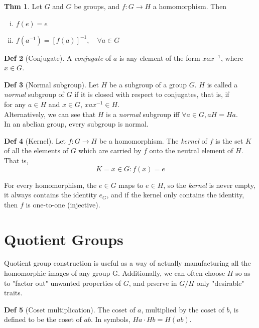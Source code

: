 \documentclass{article}
\theoremstyle{definition}
\newtheorem{definition}{Def}[section]
\newtheorem{theorem}[definition]{Thm}
\begin{document}
\begin{theorem}
    Let $G$ and $G$ be groups, and $f: G \rightarrow H$ a homomorphism. Then
    \begin{enumerate}[i.]
	\item $f(e) = e$
	\item $f(a^{-1}) = [f(a)]^{-1}, \quad \forall a \in G$
    \end{enumerate}
\end{theorem}

\begin{definition}[Conjugate]
    A \emph{conjugate} of $a$ is any element of the form $xax^{-1}$, where $x \in G$.
\end{definition}

\begin{definition}[Normal subgroup]
    Let $H$ be a subgroup of a group $G$. $H$ is called a \emph{normal} subgroup of $G$ if it is closed with respect to conjugates, that is, if\\
    for any $a \in H$ and $x \in G$, $xax^{-1} \in H$.
    \\
    Alternatively, we can see that $H$ is a \emph{normal} subgroup iff $\forall a \in G, aH = Ha$.
    \\
    In an abelian group, every subgroup is normal.
\end{definition}

\begin{definition}[Kernel]
    Let $f: G \rightarrow H$ be a homomorphism. The \emph{kernel} of $f$ is the set $K$ of all the elements of $G$ which are carried by $f$ onto the neutral element of $H$. That is,
    $$K = {x \in G : f(x) = e}$$
\end{definition}
For every homomorphism, the $e \in G$ maps to $e \in H$, so the \emph{kernel} is never empty, it always contains the identity $e_G$, and if the kernel only contains the identity, then $f$ is one-to-one (injective).


\section{Quotient Groups}

Quotient group construction is useful as a way of actually manufacturing all the homomorphic images of any group G. Additionally, we can often choose $H$ so as to "factor out" unwanted properties of $G$, and prserve in $G/H$ only "desirable" traits.

\begin{definition}[Coset multiplication]
    The coset of $a$, multiplied by the coset of $b$, is defined to be the coset of $ab$. In symbols, $Ha \cdot Hb = H(ab)$.
\end{definition}
\end{document}
